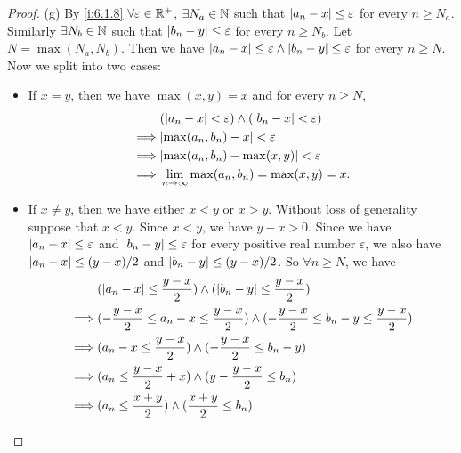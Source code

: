 \begin{proof}{(g)}
  By \cref{i:6.1.8} \(\forall \varepsilon \in \mathbb{R}^+\), \(\exists N_a \in \mathbb{N}\) such that \(\left\lvert a_n - x\right\rvert \leq \varepsilon\) for every \(n \geq N_a\).
  Similarly \(\exists N_b \in \mathbb{N}\) such that \(\left\lvert b_n - y\right\rvert \leq \varepsilon\) for every \(n \geq N_b\).
  Let \(N = \max(N_a, N_b)\).
  Then we have \(\left\lvert a_n - x\right\rvert \leq \varepsilon \land \left\lvert b_n - y\right\rvert \leq \varepsilon\) for every \(n \geq N\).
  Now we split into two cases:
  \begin{itemize}
    \item If \(x = y\), then we have \(\max(x, y) = x\) and for every \(n \geq N\),
          \begin{align*}
                     & (\abs{a_n - x} < \varepsilon) \land (\abs{b_n - x} < \varepsilon) \\
            \implies & \abs{\max(a_n, b_n) - x} < \varepsilon                            \\
            \implies & \abs{\max(a_n, b_n) - \max(x, y)} < \varepsilon                   \\
            \implies & \lim_{n \to \infty} \max(a_n, b_n) = \max(x, y) = x.
          \end{align*}
    \item If \(x \neq y\), then we have either \(x < y\) or \(x > y\).
          Without loss of generality suppose that \(x < y\).
          Since \(x < y\), we have \(y - x > 0\).
          Since we have \(\left\lvert a_n - x\right\rvert \leq \varepsilon\) and \(\left\lvert b_n - y\right\rvert \leq \varepsilon\) for every positive real number \(\varepsilon\), we also have \(\left\lvert a_n - x\right\rvert \leq (y - x) / 2\) and \(\left\lvert b_n - y\right\rvert \leq (y - x) / 2\).
          So \(\forall n \geq N\), we have
          \begin{align*}
                     & (\abs{a_n - x} \leq \dfrac{y - x}{2}) \land (\abs{b_n - y} \leq \dfrac{y - x}{2})                                   \\
            \implies & (-\dfrac{y - x}{2} \leq a_n - x \leq \dfrac{y - x}{2}) \land (-\dfrac{y - x}{2} \leq b_n - y \leq \dfrac{y - x}{2}) \\
            \implies & (a_n - x \leq \dfrac{y - x}{2}) \land (-\dfrac{y - x}{2} \leq b_n - y)                                              \\
            \implies & (a_n \leq \dfrac{y - x}{2} + x) \land (y - \dfrac{y - x}{2} \leq b_n)                                               \\
            \implies & (a_n \leq \dfrac{x + y}{2}) \land (\dfrac{x + y}{2} \leq b_n)                                                       \\

\end{align*}
\end{itemize}
\end{proof}
